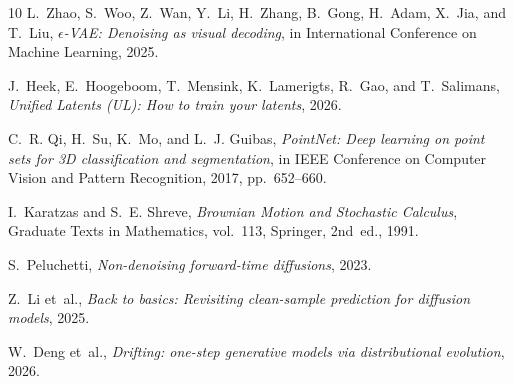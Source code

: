 \documentclass[review,onefignum,onetabnum]{siamart250211}
\newcommand{\1}{\mathbf{1}}
\begin{document}
\begin{thebibliography}{10}
{\sc L.~Zhao, S.~Woo, Z.~Wan, Y.~Li, H.~Zhang, B.~Gong, H.~Adam, X.~Jia, and T.~Liu},
{\em $\epsilon$-{VAE}: Denoising as visual decoding},
in International Conference on Machine Learning, 2025.

{\sc J.~Heek, E.~Hoogeboom, T.~Mensink, K.~Lamerigts, R.~Gao, and T.~Salimans},
{\em Unified Latents (UL): How to train your latents}, 2026.

{\sc C.~R. Qi, H.~Su, K.~Mo, and L.~J. Guibas},
{\em {PointNet}: Deep learning on point sets for {3D} classification and segmentation},
in IEEE Conference on Computer Vision and Pattern Recognition, 2017, pp.~652--660.

{\sc I.~Karatzas and S.~E. Shreve},
{\em Brownian Motion and Stochastic Calculus}, Graduate Texts in Mathematics, vol.~113, Springer, 2nd~ed., 1991.

{\sc S.~Peluchetti},
{\em Non-denoising forward-time diffusions}, 2023.

{\sc Z.~Li et~al.},
{\em Back to basics: Revisiting clean-sample prediction for diffusion models}, 2025.

{\sc W.~Deng et~al.},
{\em Drifting: one-step generative models via distributional evolution}, 2026.

\end{thebibliography}
\end{document}
